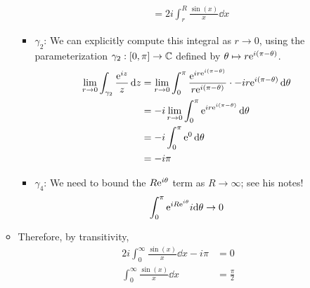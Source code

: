 \documentclass[../notes.tex]{subfiles}
\begin{document}
\begin{itemize}
\begin{itemize}
\begin{itemize}
\begin{align*}
                &= 2i\int_r^R\frac{\sin(x)}{x}\dd{x}
            \end{align*}
            \item $\gamma_2$: We can explicitly compute this integral as $r\to 0$, using the parameterization $\gamma_2:[0,\pi]\to\C$ defined by $\theta\mapsto r\e[i(\pi-\theta)]$.
            \begin{align*}
                \lim_{r\to 0}\int_{\gamma_2}\frac{\e[iz]}{z}\dd{z} &= \lim_{r\to 0}\int_0^\pi\frac{\e[{ir\e[i(\pi-\theta)]}]}{r\e[i(\pi-\theta)]}\cdot -ir\e[i(\pi-\theta)]\dd{\theta}\\
                &= -i\lim_{r\to 0}\int_0^\pi\e[{ir\e[i(\pi-\theta)]}]\dd{\theta}\\
                &= -i\int_0^\pi\e[0]\dd{\theta}\\
                &= -i\pi
            \end{align*}
            \item $\gamma_4$: We need to bound the $R\e[i\theta]$ term as $R\to\infty$; see his notes!
            \begin{equation*}
                \int_0^\pi\e[{iR\e[i\theta]}]i\dd\theta \to 0
            \end{equation*}
        \end{itemize}
        \item Therefore, by transitivity,
        \begin{align*}
            2i\int_0^\infty\frac{\sin(x)}{x}\dd{x}-i\pi &= 0\\
            \int_0^\infty\frac{\sin(x)}{x}\dd{x} &= \frac{\pi}{2}
        \end{align*}
    \end{itemize}
\end{itemize}
\end{document}
